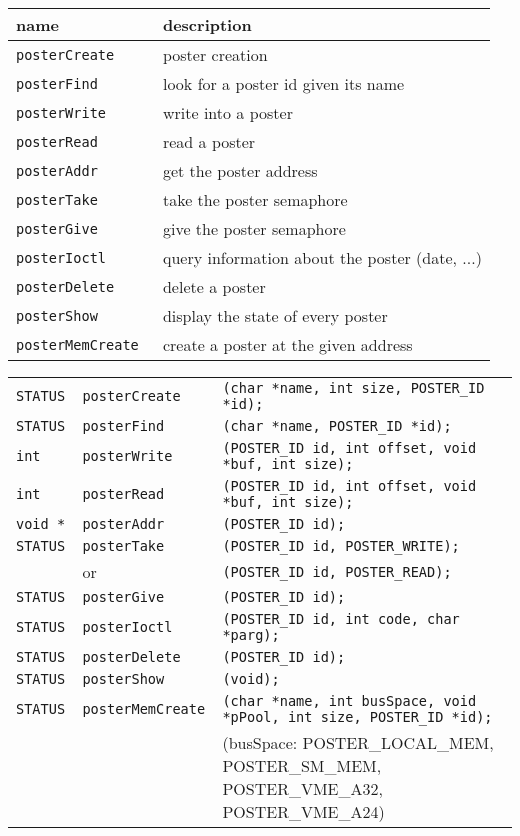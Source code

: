 \begin{center}\small\begin{tabularx}{\linewidth}{|l|X|}
\hline
name		& description \\
\hline
\tt posterCreate & poster creation \\
\tt posterFind	& look for a poster id given its name\\
\tt posterWrite	& write into a poster \\
\tt posterRead  & read a poster \\
\tt posterAddr  & get the poster address \\
\tt posterTake	& take the poster semaphore  \\
\tt posterGive	& give the poster semaphore \\
\tt posterIoctl & query information about the poster (date, ...) \\
\tt posterDelete & delete a poster \\
\tt posterShow & display the state of every poster \\
\tt posterMemCreate & create a poster at the given address \\
\hline
\end{tabularx}\end{center}

\begin{center}\small\begin{tabularx}{\linewidth}{|llX|}
\hline
\tt STATUS  & \tt posterCreate & \tt (char *name,      int size, 
	                        POSTER\_ID *id); \\
\tt STATUS  & \tt posterFind   & \tt (char *name,      POSTER\_ID *id); \\
\tt int     & \tt posterWrite  & \tt (POSTER\_ID id,   int offset,
	    		        void *buf,         int size); \\
\tt int     & \tt posterRead   & \tt (POSTER\_ID id,   int offset, 
	                        void *buf,     int size); \\
\tt void *  & \tt posterAddr   & \tt (POSTER\_ID id);  \\
\tt STATUS  & \tt posterTake   & \tt (POSTER\_ID id,   POSTER\_WRITE); \\
	    & 	or    	       & \tt (POSTER\_ID id,   POSTER\_READ); \\
\tt STATUS  & \tt posterGive   & \tt (POSTER\_ID id);   \\
\tt STATUS  & \tt posterIoctl  & \tt (POSTER\_ID id, int code, char *parg); \\
\tt STATUS  & \tt posterDelete & \tt (POSTER\_ID id);  \\
\tt STATUS  & \tt posterShow   & \tt (void);  \\
\tt STATUS  & \tt posterMemCreate & \tt (char *name,  int busSpace, 
				void *pPool, int size, POSTER\_ID *id); \\
& & {\footnotesize (busSpace: POSTER\_LOCAL\_MEM,
	    POSTER\_SM\_MEM, POSTER\_VME\_A32, POSTER\_VME\_A24)} \\
\hline
\end{tabularx}\end{center}


